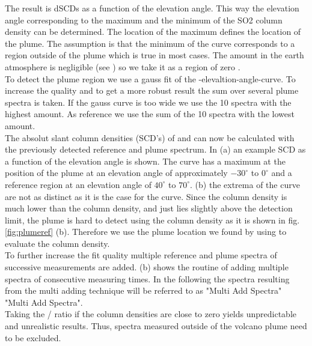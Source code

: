 The result is  dSCDs as a function of the elevation angle. This way the elevation angle corresponding to the maximum and the minimum of the SO2 column density can be determined. The location of the  maximum defines the location of the plume. The assumption is that the minimum of the  curve corresponds to a region outside of the plume which is true in most cases. The  amount in the earth atmosphere is negligible (see  ) so we take it as a region of zero . \\
To detect the plume region we use a gauss fit of the -elevaltion-angle-curve.
To increase the quality and to get a more robust result the sum over several plume spectra is taken. If the gauss curve is too wide we use the 10 spectra with the highest  amount. As reference we use the sum of the 10 spectra with the lowest  amount.\\
%
The absolut slant column densities (SCD's) of   and  can now be calculated with the previously detected reference and plume spectrum.
In  (a) an example  SCD as a function of the elevation angle is shown. The  curve has a maximum at the position of the plume at an elevation angle of approximately $-30^{\circ}$ to $0^{\circ}$  and a reference region at an elevation angle of $40^{\circ}$ to $70^{\circ}$.  (b) the extrema of the   curve are not as distinct as it is the case for the  curve.
Since the  column density is much lower than the  column density, and just lies slightly above the detection limit, the plume is hard to detect using the  column density as it is shown in fig. \ref{fig:plumeref} (b). 
Therefore we use the plume location we found by using  to evaluate the  column density.\\
To further increase the fit quality multiple reference and plume spectra of successive measurements are added.
 (b) shows the routine of adding multiple spectra of consecutive measuring times. In the following the spectra resulting from the multi adding technique will be referred to as "Multi Add Spectra" "Multi Add Spectra".\\
%
Taking the / ratio if the column densities are close to zero yields unpredictable and unrealistic results. Thus, spectra measured outside of the volcano plume need to be excluded.

